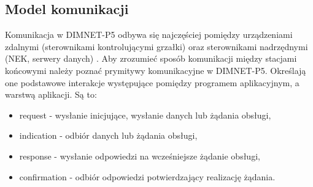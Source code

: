 \subsection{Model komunikacji}
Komunikacja w DIMNET-P5 odbywa się najczęściej pomiędzy urządzeniami zdalnymi (sterownikami kontrolującymi grzałki) oraz sterownikami nadrzędnymi (NEK, serwery danych) \cite{dimnetp5-spec}. Aby zrozumieć sposób komunikacji między stacjami końcowymi należy poznać prymitywy komunikacyjne w DIMNET-P5. Określają one podstawowe interakcje występujące pomiędzy programem aplikacyjnym, a warstwą aplikacji. Są to:
\begin{itemize}
\item request - wysłanie inicjujące, wysłanie danych lub żądania obsługi,
\item indication - odbiór danych lub żądania obsługi,
\item response - wysłanie odpowiedzi na wcześniejsze żądanie obsługi,
\item confirmation - odbiór odpowiedzi potwierdzający realizację żądania.
\end{itemize}


